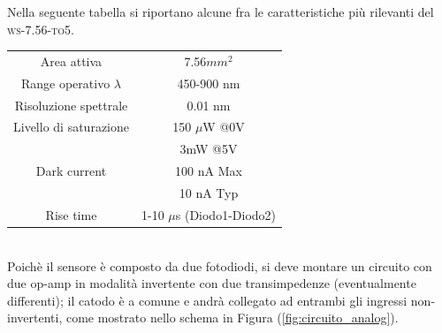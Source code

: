 \documentclass[10pt,letterpaper]{article}
\begin{document}
Nella seguente tabella si riportano alcune fra le caratteristiche più rilevanti del \textsc{ws-7.56-to5}.

\begin{table}[h]
\centering
\begin{tabular}{c|c}
\hline Area attiva & 7.56$mm^2$ \\ 
 Range operativo $\lambda$ & 450-900 nm \\ 
 Risoluzione spettrale & 0.01 nm \\ 
 Livello di saturazione & 150 $\mu$W @0V \\ 
  & 3mW @5V \\ 
 Dark current  & 100 nA Max\\ 
  & 10 nA Typ \\
 Rise time & 1-10 $\mu$s (Diodo1-Diodo2) \\
 
\hline
\end{tabular} 
\end{table}
~\\

Poichè il sensore è composto da due fotodiodi, si deve montare un circuito con due op-amp in modalità invertente con due transimpedenze (eventualmente differenti); il catodo è a comune e andrà collegato ad entrambi gli ingressi non-invertenti, come mostrato nello schema in Figura (\ref{fig:circuito_analog}).\\

\begin{figure}
\centering
{}
{}

\caption{}
\label{schema+respons}
\end{figure}
\end{document}
